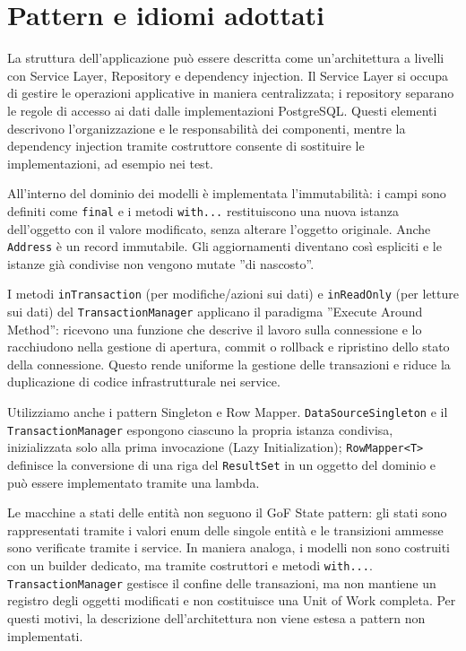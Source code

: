 \section{Pattern e idiomi adottati}

La struttura dell'applicazione può essere descritta come un'architettura a livelli con Service Layer, Repository e dependency injection. Il Service Layer si occupa di gestire le operazioni applicative in maniera centralizzata; i repository separano le regole di accesso ai dati dalle implementazioni PostgreSQL. Questi elementi descrivono l'organizzazione e le responsabilità dei componenti, mentre la dependency injection tramite costruttore consente di sostituire le implementazioni, ad esempio nei test.

All'interno del dominio dei modelli è implementata l'immutabilità: i campi sono definiti come \texttt{final} e i metodi \texttt{with...} restituiscono una nuova istanza dell'oggetto con il valore modificato, senza alterare l'oggetto originale. Anche \texttt{Address} è un record immutabile. Gli aggiornamenti diventano così espliciti e le istanze già condivise non vengono mutate ''di nascosto''.

I metodi \texttt{inTransaction} (per modifiche/azioni sui dati) e \texttt{inReadOnly} (per letture sui dati) del \texttt{TransactionManager} applicano il paradigma ''Execute Around Method'': ricevono una funzione che descrive il lavoro sulla connessione e lo racchiudono nella gestione di apertura, commit o rollback e ripristino dello stato della connessione. Questo rende uniforme la gestione delle transazioni e riduce la duplicazione di codice infrastrutturale nei service.

Utilizziamo anche i pattern Singleton e Row Mapper. \texttt{DataSourceSingleton} e il \texttt{TransactionManager} espongono ciascuno la propria istanza condivisa, inizializzata solo alla prima invocazione (Lazy Initialization); \texttt{RowMapper<T>} definisce la conversione di una riga del \texttt{ResultSet} in un oggetto del dominio e può essere implementato tramite una lambda.

Le macchine a stati delle entità non seguono il GoF State pattern: gli stati sono rappresentati tramite i valori enum delle singole entità e le transizioni ammesse sono verificate tramite i service. In maniera analoga, i modelli non sono costruiti con un builder dedicato, ma tramite costruttori e metodi \texttt{with...}. \texttt{TransactionManager} gestisce il confine delle transazioni, ma non mantiene un registro degli oggetti modificati e non costituisce una Unit of Work completa. Per questi motivi, la descrizione dell'architettura non viene estesa a pattern non implementati.

